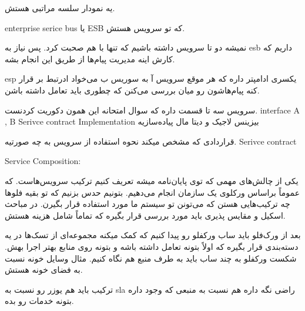 یه نمودار سلسه مراتبی هستش.

enterprise serice bus یا ESB که تو سرویس هستش.

نمیشه دو تا سرویس داشته باشیم که تنها با هم صحبت کرد. پس نیاز به esb داریم که
کارش اینه مدیریت پیام‌ها از طریق این انجام بشه.

esp یکسری ادامپتر داره که هر موقع سرویس آ به سوریس ب می‌خواد ادرتبط بر قرار کنه
پیام‌هاشون رو میان بررسی می‌کنن که چطوری باید تعامل داشته باشن.


سرویس سه تا قسمت داره که سوال امتحانه
این همون دکوریت کردنست.
interface A , B  Serivce contract Implementation
بیزینس لاجیک و دیتا مال پیاده‌سازیه

قراردادی که مشخص میکند نحوه استفاده از سرویس به چه صورتیه. Serivce contract

Service Composition:

یکی از چالش‌های مهمی که توی پایان‌نامه میشه تعریف کنیم ترکیب سرویس‌هاست. که
عموماً براساس ورکلوی یک سازمان انجام می‌دهیم. بتونیم حدس بزنیم که تو بقیه فلوها
چه ترکیب‌هایی هستن که می‌تونن تو سیستم ما مورد استفاده قرار بگیرن. در مباحث
اسکیل و مقایس پذیری باید مورد بررسی قرار بگیره که تماماً شامل هزینه هستش.

بعد از ورک‌فلو باید ساب ورکفلو رو پیدا کنیم که کمک میکنه مجموعه‌ای از تسک‌ها در
یه دسته‌بندی قرار بگیره که اولاً بتونه تعامل داشته باشه و بتونه روی منابع بهتر
اجرا بهش. شکست ورکفلو به چند ساب باید به طرف منبع هم نگاه کنیم. مثال وسایل خونه
نسبت به فضای خونه هستش.

ترکیب باید هم یوزر رو نسبت به sla راضی نگه داره هم نسبت به منبعی که وجود داره
بتونه خدمات رو بده.